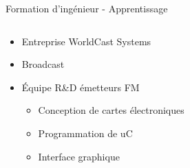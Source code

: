 \documentclass[t,compress,mathserif,12pt,xcolor=dvipsnames]{beamer}
\begin{document}
\begin{frame}[t]{Formation d'ingénieur - Apprentissage}
  \begin{minipage}[t][5.0cm][t]{\textwidth}
    \begin{columns}[T]
      \begin{column}{0.63\textwidth}
        \begin{itemize}
          \item<+-> Entreprise WorldCast Systems
          \item<+-> Broadcast
          \item<+-> \'Equipe R\&D émetteurs FM
          \begin{itemize}
            \item<+-> Conception de cartes électroniques
            \item<+-> Programmation de uC
            \item<+-> Interface graphique
          \end{itemize}
        \end{itemize}
      \end{column}
      \begin{column}{0.04\textwidth}


\end{column}
\end{columns}
\end{minipage}
\end{frame}
\end{document}
